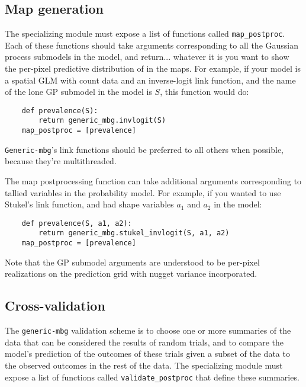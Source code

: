 \subsection{Map generation}
\label{sub:map} 
The specializing module must expose a list of functions called \texttt{map\_postproc}. Each of these functions should take arguments corresponding to all the Gaussian process submodels in the model, and return... whatever it is you want to show the per-pixel predictive distribution of in the maps. For example, if your model is a spatial GLM with count data and an inverse-logit link function, and the name of the lone GP submodel in the model is $S$, this function would do:
\begin{verbatim}
    def prevalence(S):
        return generic_mbg.invlogit(S)
    map_postproc = [prevalence]
\end{verbatim}
\texttt{Generic-mbg}'s link functions should be preferred to all others when possible, because they're multithreaded.

The map postprocessing function can take additional arguments corresponding to tallied variables in the probability model. For example, if you wanted to use Stukel's link function, and had shape variables $a_1$ and $a_2$ in the model:
\begin{verbatim}
    def prevalence(S, a1, a2):
        return generic_mbg.stukel_invlogit(S, a1, a2)
    map_postproc = [prevalence]
\end{verbatim}
Note that the GP submodel arguments are understood to be per-pixel realizations on the prediction grid with nugget variance incorporated.

\subsection{Cross-validation} 
The \texttt{generic-mbg} validation scheme is to choose one or more summaries of the data that can be considered the results of random trials, and to compare the model's prediction of the outcomes of these trials given a subset of the data to the observed outcomes in the rest of the data. The specializing module must expose a list of functions called \texttt{validate\_postproc} that define these summaries. 


